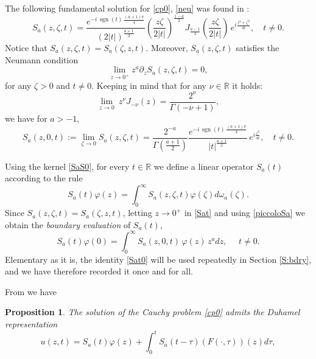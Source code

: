 \documentclass[11pt,letter]{amsart}
\def \R {\mathbb{R}}
\def \G{\Gamma}
\def \vf{\varphi}
\newcommand{\p}{\partial}
\numberwithin{equation}{section}
\newtheorem{proposition}[theorem]{Proposition}
\numberwithin{equation}{section}
\begin{document}
The following fundamental solution for \eqref{cp0}, \eqref{neu} was found in \cite[Prop. 1.1]{GS}: 
\begin{equation}\label{SaS0}
S_a(z,\zeta,t)
=
\frac{e^{-i\,\operatorname{sgn}(t)\,\frac{(a+1)\pi}{4}}}{(2|t|)^{\frac{a+1}{2}}}
\left(\frac{z\zeta}{2|t|}\right)^{\frac{1-a}{2}}
J_{\frac{a-1}{2}}\!\left(\frac{z\zeta}{2|t|}\right)
\,e^{i \frac{z^2+\zeta^2}{4t}}, \quad t \neq 0.
\end{equation}
Notice that $S_a(z,\zeta,t)=S_a(\zeta,z,t)$. Moreover, $S_a(z,\zeta,t)$ satisfies the Neumann condition 
\begin{equation}\label{dzpazero}
\underset{z\to 0^+}{\lim} z^a \p_z S_a(z,\zeta,t) = 0,
\end{equation}
for any $\zeta>0$ and $t\not=0$. Keeping in mind that for any $\nu\in \R$ it holds: 
\begin{equation}\label{asy0}
\underset{z\to 0}{\lim}\ z^{\nu} J_{-\nu}(z) = \frac{2^{\nu}}{\G(-\nu+1)},
\end{equation}
we have for $a>-1$,
\begin{equation}\label{piccoloSa}
S_a(z,0,t):=\lim_{\zeta\to 0} S_a(z,\zeta,t)
=
\frac{2^{-a}}{\Gamma\!\left(\frac{a+1}{2}\right)}
\frac{e^{-i\,\operatorname{sgn}(t)\,\frac{(a+1)\pi}{4}}}{|t|^{\frac{a+1}{2}}}
\,e^{i \frac{z^2}{4t}}, \quad t \neq 0.
\end{equation}



Using the kernel \eqref{SaS0}, for every $t\in \R$ we define a linear operator $S_a(t)$ according to the rule
\begin{equation}\label{Sat}
S_a(t)\vf(z) =
\int_0^\infty S_a(z,\zeta,t) \vf(\zeta) d\omega_a(\zeta).
\end{equation}
Since $S_a(z,\zeta,t) = S_a(\zeta,z,t)$, letting $z\to 0^+$ in \eqref{Sat} and using \eqref{piccoloSa} we obtain the \emph{boundary evaluation} of $S_a(t)$,
\begin{equation}\label{Sat0}
S_a(t)\vf(0) = \int_0^\infty S_a(z,0,t)\, \vf(z)\, z^a dz,\ \ \ \ \ \ t\not= 0.
\end{equation}
Elementary as it is, the identity \eqref{Sat0} will be used repeatedly in Section \ref{S:bdry}, and we have therefore recorded it once and for all.


From \cite[Prop. 1.1]{GS} we have
\begin{proposition}\label{P:repa}
The solution of the Cauchy problem \eqref{cp0} admits the Duhamel representation 
\begin{equation}\label{kernel}
u(z,t) =  S_a(t)\vf(z) + \int_0^t S_a(t-\tau)(F(\cdot,\tau))(z) d\tau,
\end{equation}
\end{proposition}
\end{document}
